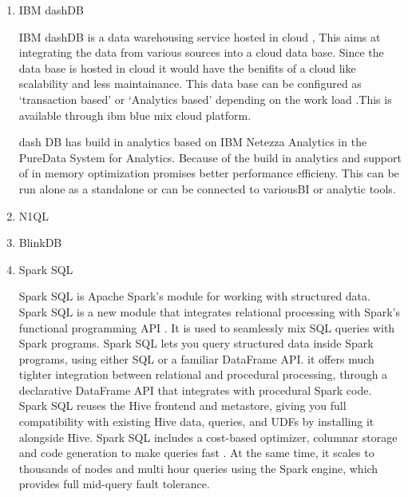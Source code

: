 \begin{enumerate}
\item {} 
IBM dashDB

IBM dashDB is a data warehousing service hosted in cloud ,
This aims at integrating the data from various sources into a
cloud data base. Since the data base is hosted in cloud it
would have the benifits of a cloud like scalability and less
maintainance. This data base can be configured as `transaction
based' or `Analytics based' depending on the work load
\label{\detokenize{i524/technologies:id388}}{\hyperref[\detokenize{i524/technologies:www-ibm-dash-db-com}]{\sphinxcrossref{{[}332{]}}}} .This is available through ibm blue mix
cloud platform.

dash DB has build in analytics based on IBM Netezza Analytics
in the PureData System for Analytics. Because of the build in
analytics and support of
in memory optimization promises better performance efficieny.
This can be run alone as a standalone or can be connected to
variousBI or analytic tools. \label{\detokenize{i524/technologies:id389}}{\hyperref[\detokenize{i524/technologies:www-ibm-analytics-com}]{\sphinxcrossref{{[}333{]}}}}

\item {} 
N1QL

\item {} 
BlinkDB

\item {} 
Spark SQL

Spark SQL is Apache Spark's module for working with structured
data. Spark SQL is a new module that integrates relational
processing with Spark's functional programming API
\label{\detokenize{i524/technologies:id390}}{\hyperref[\detokenize{i524/technologies:www-spark-sql}]{\sphinxcrossref{{[}334{]}}}}. It is used to seamlessly mix SQL queries
with Spark programs. Spark SQL lets you query structured data
inside Spark programs, using either SQL or a familiar DataFrame
API.  it offers much tighter integration between relational and
procedural processing, through a declarative DataFrame API that
integrates with procedural Spark code.  Spark SQL reuses the Hive
frontend and metastore, giving you full compatibility with
existing Hive data, queries, and UDFs by installing it alongside
Hive. Spark SQL includes a cost-based optimizer, columnar storage
and code generation to make queries fast
\label{\detokenize{i524/technologies:id391}}{\hyperref[\detokenize{i524/technologies:www-spark-sql-2}]{\sphinxcrossref{{[}335{]}}}}. At the same time, it scales to thousands
of nodes and multi hour queries using the Spark engine, which
provides full mid-query fault tolerance.

\end{enumerate}


